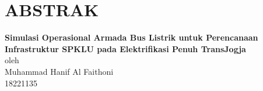 \chapter*{ABSTRAK}

\begin{center}

    \textbf{Simulasi Operasional Armada Bus Listrik untuk Perencanaan Infrastruktur SPKLU pada Elektrifikasi Penuh TransJogja} \\
    \vspace{0.4cm}
    oleh \\
    \vspace{0.4cm}
    Muhammad Hanif Al Faithoni\\
    18221135\\
\end{center}


